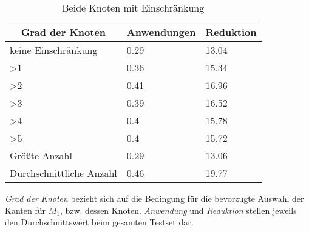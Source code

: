 \begin{table}[htb]
\caption{Beide Knoten mit Einschränkung\label{tab:degreeAND}}
\vspace*{1em}
\centering

\bgroup
\def\arraystretch{1.3}%

\begin{threeparttable}

\begin{tabular}[c]{l|l|l}
	
	\multicolumn{1}{c|}{\textbf{Grad der Knoten}} & 
	\multicolumn{1}{c|}{\textbf{Anwendungen}} & 
	\multicolumn{1}{c}{\textbf{Reduktion}} \\ 
	
	\hline

	keine Einschränkung&0.29&13.04\\
	>1&0.36 &15.34 \\
	>2&0.41 &16.96 \\
	>3& 0.39& 16.52 \\
	>4& 0.4 &15.78 \\
	>5& 0.4 & 15.72\\
	Größte Anzahl& 0.29 &13.06 \\
	Durchschnittliche Anzahl& 0.46&19.77 \\
	
\end{tabular}
\begin{tablenotes}\footnotesize
\item \emph{Grad der Knoten} bezieht sich auf die Bedingung für die bevorzugte Auswahl der Kanten für $M_{1}$, bzw. dessen Knoten. \emph{Anwendung} und \emph{Reduktion} stellen jeweils den Durchschnittswert beim gesamten Testset dar.
\end{tablenotes}

\end{threeparttable}

\egroup

\end{table}




